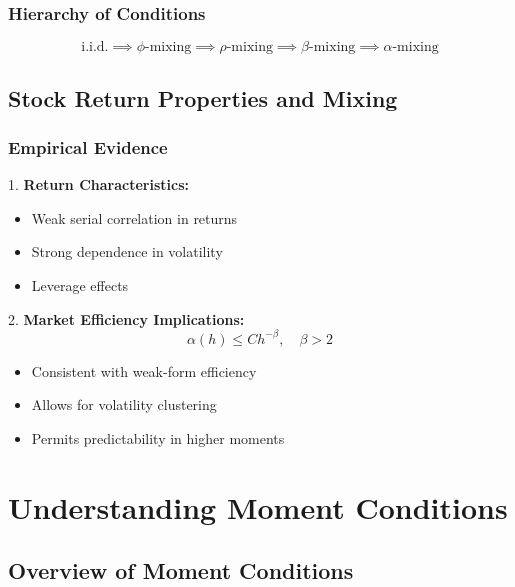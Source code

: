 \documentclass[12pt,article]{memoir}
\begin{document}
\subsubsection{Hierarchy of Conditions}
\begin{equation}
    \text{i.i.d.} \implies \text{$\phi$-mixing} \implies \text{$\rho$-mixing} \implies \text{$\beta$-mixing} \implies \text{$\alpha$-mixing}
\end{equation}

\subsection{Stock Return Properties and Mixing}

\subsubsection{Empirical Evidence}

1. \textbf{Return Characteristics:}
   \begin{itemize}
       \item Weak serial correlation in returns
       \item Strong dependence in volatility
       \item Leverage effects
   \end{itemize}

2. \textbf{Market Efficiency Implications:}
\begin{equation}
    \alpha(h) \leq Ch^{-\beta}, \quad \beta > 2
\end{equation}
   \begin{itemize}
       \item Consistent with weak-form efficiency
       \item Allows for volatility clustering
       \item Permits predictability in higher moments
   \end{itemize}


\section{Understanding Moment Conditions}

\subsection{Overview of Moment Conditions}
\end{document}
